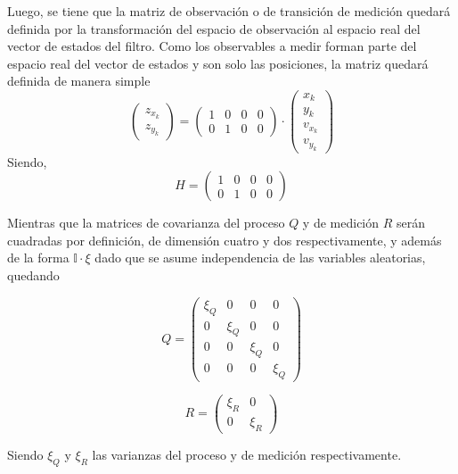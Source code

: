 Luego, se tiene que la matriz de observación o de transición de medición quedará definida por la transformación del espacio de observación al espacio real del vector de estados del filtro. Como los observables a medir forman parte del espacio real del vector de estados y son solo las posiciones, la matriz quedará definida de manera simple
\begin{equation}
\begin{pmatrix} z_{x_{k}} \\ z_{y_{k}} \end{pmatrix}=\begin{pmatrix}
1 & 0 & 0  & 0\\
0 & 1  & 0 & 0  \end{pmatrix} \cdot  \begin{pmatrix} x_k \\ y_k \\ v_{x_{k}} \\ v_{y_{k}}
\end{pmatrix}
\end{equation}
Siendo,
\begin{equation}
H = 
\begin{pmatrix}
1 & 0 & 0  & 0\\
0 & 1  & 0 & 0 
\end{pmatrix}
\end{equation}

Mientras que la matrices de covarianza del proceso $Q$ y de medición $R$ serán cuadradas por definición, de dimensión cuatro y dos respectivamente, y además de la forma $\mathbb{I}\cdot \xi$ dado que se asume independencia de las variables aleatorias, quedando

\begin{equation}
Q = 
\begin{pmatrix}
\xi_Q & 0 & 0  & 0\\
0 & \xi_Q  & 0 & 0\\
0 & 0  & \xi_Q  & 0\\
0 & 0  & 0  & \xi_Q 
\end{pmatrix}
\end{equation}

\begin{equation}
R = 
\begin{pmatrix}
\xi_R & 0 \\
0 & \xi_R 
\end{pmatrix}
\end{equation}

Siendo $\xi_Q$ y $\xi_R$ las varianzas del proceso y de medición respectivamente.

